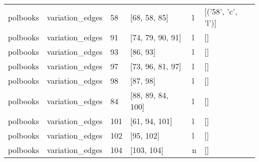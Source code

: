 \begin{tabular}{llllll}
polbooks & variation_edges & 58 & [68, 58, 85] & l & [('58', 'c', 'l')] \\
polbooks & variation_edges & 91 & [74, 79, 90, 91] & l & [] \\
polbooks & variation_edges & 93 & [86, 93] & l & [] \\
polbooks & variation_edges & 97 & [73, 96, 81, 97] & l & [] \\
polbooks & variation_edges & 98 & [87, 98] & l & [] \\
polbooks & variation_edges & 84 & [88, 89, 84, 100] & l & [] \\
polbooks & variation_edges & 101 & [61, 94, 101] & l & [] \\
polbooks & variation_edges & 102 & [95, 102] & l & [] \\
polbooks & variation_edges & 104 & [103, 104] & n & [] \\
\bottomrule
\end{tabular}


